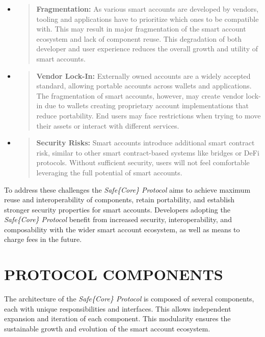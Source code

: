 \documentclass[
]{article}
\begin{document}
\begin{itemize}
  \item
        \begin{quote}
          \textbf{Fragmentation:} As various smart accounts are developed by vendors, tooling and applications have to prioritize which ones to be compatible with. This may result in major fragmentation of the smart account ecosystem and lack of component reuse. This degradation of both developer and user experience reduces the overall growth and utility of smart accounts.
        \end{quote}
  \item
        \begin{quote}
          \textbf{Vendor Lock-In:} Externally owned accounts are a widely accepted standard, allowing portable accounts across wallets and applications. The fragmentation of smart accounts, however, may create vendor lock-in due to wallets creating proprietary account implementations that reduce portability. End users may face restrictions when trying to move their assets or interact with different services.
        \end{quote}
  \item
        \begin{quote}
          \textbf{Security Risks:} Smart accounts introduce additional smart contract risk, similar to other smart contract-based systems like bridges or DeFi protocols. Without sufficient security, users will not feel comfortable leveraging the full potential of smart accounts.
        \end{quote}
\end{itemize}

To address these challenges the \emph{Safe\{Core\} Protocol} aims to achieve maximum reuse and interoperability of components, retain portability, and establish stronger security properties for smart accounts. Developers adopting the \emph{Safe\{Core\} Protocol} benefit from increased security, interoperability, and composability with the wider smart account ecosystem, as well as means to charge fees in the future.

\hypertarget{protocol-components}{%
  \section{PROTOCOL COMPONENTS}\label{protocol-components}}

The architecture of the \emph{Safe\{Core\} Protocol} is composed of several components, each with unique responsibilities and interfaces. This allows independent expansion and iteration of each component. This modularity ensures the sustainable growth and evolution of the smart account ecosystem.
\end{document}
